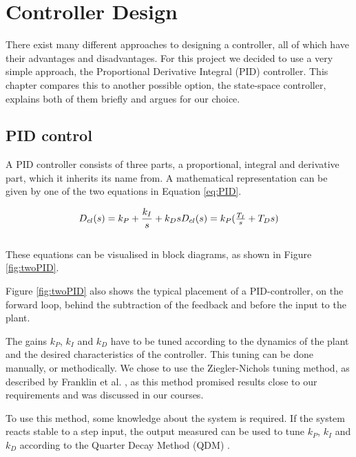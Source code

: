 \chapter{Controller Design}\label{ch:controldesign}
There exist many different approaches to designing a controller,
all of which have their advantages and disadvantages.
For this project we decided to use a very simple approach,
the Proportional Derivative Integral (PID) controller.
This chapter compares this to another possible option,
the state-space controller, explains both of them briefly
and argues for our choice.

\section{PID control}\label{sec:PID}
A PID controller consists of three parts,
a proportional, integral and derivative part,
which it inherits its name from.
A mathematical representation can be given by one of the two equations in Equation \ref{eq:PID}.

\begin{equation}
	  D_{cl}(s) = k_P + \frac{k_I}{s} + k_D s$$
	$$D_{cl}(s) = k_P ( \frac{T_I}{s} + T_D s)
	 \label{eq:PID}
\end{equation} \cite{Franklin2014}\\
These equations can be visualised in block diagrams, as shown in Figure \ref{fig:twoPID}.

Figure \ref{fig:twoPID} also shows the typical placement of a PID-controller,
on the forward loop, behind the subtraction of the feedback and before the input to the plant.

The gains $k_P$, $k_I$ and $k_D$ have to be tuned according to the dynamics of the plant
and the desired characteristics of the controller.
This tuning can be done manually, or methodically.
We chose to use the Ziegler-Nichols tuning method,
as described by Franklin et al. \cite{Franklin2014},
as this method promised results close to our requirements and was discussed in our courses.

To use this method, some knowledge about the system is required.
If the system reacts stable to a step input,
the output measured can be used to tune $k_P$, $k_I$ and $k_D$
according to the Quarter Decay Method (QDM) \cite{Franklin2014}.

